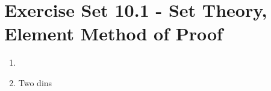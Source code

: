 \documentclass[12pt]{article}
\begin{document}

\setcounter{section}{10}
\section*{Exercise Set 10.1 - Set Theory, Element Method of Proof}
\begin{enumerate}
\item %

\setcounter{enumi}{2}
\item %
Two dins
\end{enumerate}
\end{document}
